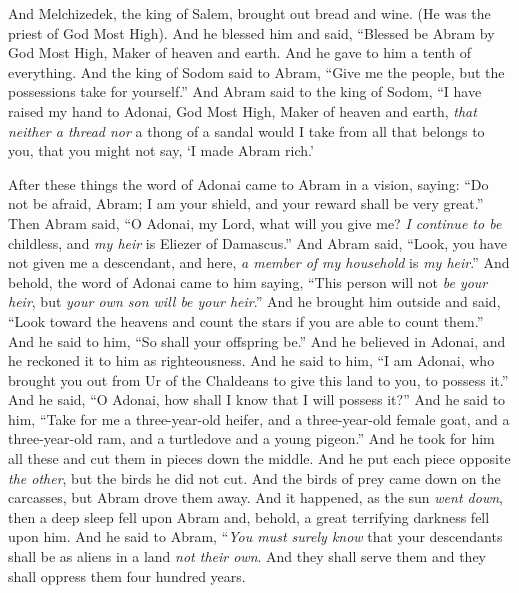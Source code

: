 \begin{biblechapter}
\verse And Melchizedek, the king of Salem, brought out bread and wine. (He was the priest of God Most High).
\verse And he blessed him and said,
\verse “Blessed be Abram by God Most High, 
Maker of heaven and earth.
\verse And he gave to him a tenth of everything.
\verse And the king of Sodom said to Abram, “Give me the people, but the possessions take for yourself.”
\verse And Abram said to the king of Sodom, “I have raised my hand to Adonai, God Most High, Maker of heaven and earth,
\verse \textit{that neither a thread nor} a thong of a sandal would I take from all that belongs to you, that you might not say, ‘I made Abram rich.’
\end{biblechapter}

\begin{biblechapter} %
 After these things the word of Adonai came to Abram in a vision, saying: “Do not be afraid, Abram; I am your shield, and your reward shall be very great.”
\verse Then Abram said, “O Adonai, my Lord, what will you give me? \textit{I continue to be} childless, and \textit{my heir} is Eliezer of Damascus.”
\verse And Abram said, “Look, you have not given me a descendant, and here, \textit{a member of my household} is \textit{my heir}.”
\verse And behold, the word of Adonai came to him saying, “This person will not \textit{be your heir}, but \textit{your own son will be your heir}.”
\verse And he brought him outside and said, “Look toward the heavens and count the stars if you are able to count them.” And he said to him, “So shall your offspring be.”
\verse And he believed in Adonai, and he reckoned it to him as righteousness.
\verse And he said to him, “I am Adonai, who brought you out from Ur of the Chaldeans to give this land to you, to possess it.”
\verse And he said, “O Adonai, how shall I know that I will possess it?”
\verse And he said to him, “Take for me a three-year-old heifer, and a three-year-old female goat, and a three-year-old ram, and a turtledove and a young pigeon.”
\verse And he took for him all these and cut them in pieces down the middle. And he put each piece opposite \textit{the other}, but the birds he did not cut.
\verse And the birds of prey came down on the carcasses, but Abram drove them away.
\verse And it happened, as the sun \textit{went down}, then a deep sleep fell upon Abram and, behold, a great terrifying darkness fell upon him.
\verse And he said to Abram, “\textit{You must surely know} that your descendants shall be as aliens in a land \textit{not their own}. And they shall serve them and they shall oppress them four hundred years.

\end{biblechapter}
